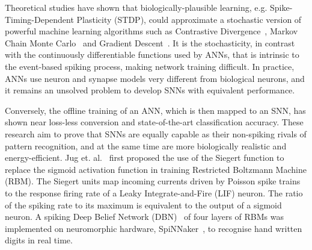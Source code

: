 Theoretical studies have shown that biologically-plausible learning, e.g. Spike-Timing-Dependent Plasticity (STDP), could approximate a stochastic version of powerful machine learning algorithms
such as 
Contrastive Divergence~\cite{neftci2013event}, Markov Chain Monte Carlo~\cite{buesing2011neural} and Gradient Descent~\cite{o2016deep}.
It is the stochasticity, in contrast with the continuously differentiable functions used by ANNs, that is intrinsic to the event-based spiking process, making network training difficult.
In practice, ANNs use neuron and synapse models very different from biological neurons, and it remains an unsolved problem to develop SNNs with equivalent performance.


Conversely, the offline training of an ANN, which is then mapped to an SNN, has shown near loss-less conversion and state-of-the-art classification accuracy.
These research aim to prove that SNNs are equally capable as their non-spiking rivals of pattern recognition, and at the same time are more biologically realistic and energy-efficient.
Jug et. al.~\cite{Jug_etal_2012} first proposed the use of the Siegert function to replace the sigmoid activation function in training Restricted Boltzmann Machine (RBM).
The Siegert units map incoming currents driven by Poisson spike trains to the response firing rate of a Leaky Integrate-and-Fire (LIF) neuron.
The ratio of the spiking rate to its maximum is equivalent to the output of a sigmoid neuron.
A spiking Deep Belief Network (DBN)~\cite{Stromatias2015scalable} of four layers of RBMs was implemented on neuromorphic hardware, SpiNNaker~\cite{furber2014spinnaker}, to recognise hand written digits in real time.

